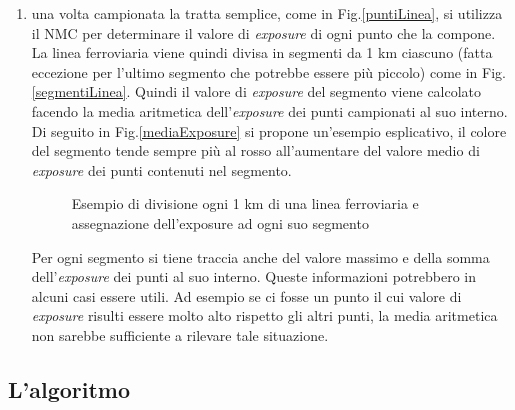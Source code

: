 \begin{enumerate}
\item una volta campionata la tratta semplice, come in Fig.\ref{puntiLinea}, si utilizza il NMC per determinare il valore di \textit{exposure} di ogni punto che la compone. \newline
La linea ferroviaria viene quindi divisa in segmenti da 1 km ciascuno (fatta eccezione per l'ultimo segmento che potrebbe essere più piccolo) come in Fig.\ref{segmentiLinea}. Quindi il valore di \textit{exposure}  del segmento viene calcolato facendo la media aritmetica dell'\textit{exposure} dei punti campionati al suo interno. Di seguito in Fig.\ref{mediaExposure}  si propone un'esempio esplicativo, il colore del segmento tende sempre più al rosso all'aumentare del valore medio di \textit{exposure} dei punti contenuti nel segmento.

\begin{figure}[bth]
	\myfloatalign
	 \quad
	\caption[dove]{Esempio di divisione ogni 1 km di una linea ferroviaria e assegnazione dell'exposure  ad ogni suo segmento }
	\label{fig:aggregazioneLinea}
\end{figure}

Per ogni segmento si tiene traccia anche del valore massimo e della somma dell'\textit{exposure} dei punti al suo interno. Queste informazioni potrebbero in alcuni casi essere utili. Ad esempio se ci fosse un punto il cui valore di \textit{exposure} risulti essere molto alto rispetto gli altri punti, la media aritmetica non sarebbe sufficiente a rilevare tale situazione. 

\end{enumerate}




\subsection{L'algoritmo}
